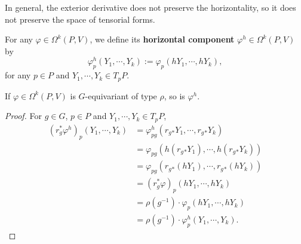 In general, the exterior derivative does not preserve the horizontality, so it does not preserve the space of tensorial forms.
\begin{definition}
    For any $\varphi\in\Omega^k(P, V)$, we define its \textbf{horizontal component} $\varphi^h\in\Omega^k(P, V)$ by
    \begin{equation*}
        \varphi^h_p(Y_1, \cdots, Y_k) := \varphi_p(hY_1, \cdots, hY_k),
    \end{equation*}
    for any $p\in P$ and $Y_1, \cdots, Y_k\in T_pP$. 
\end{definition}
\begin{proposition}\label{prop:horizontal-component-preserves-G-equivariance}
    If $\varphi\in\Omega^k(P, V)$ is $G$-equivariant of type $\rho$, so is $\varphi^h$.
\end{proposition}
\begin{proof}
    For $g\in G$, $p\in P$ and $Y_1, \cdots, Y_k\in T_pP$,
    \begin{align*}
        (r_g^*\varphi^h)_p(Y_1, \cdots, Y_k) 
        &= \varphi^h_{pg}(r_g{}_*Y_1, \cdots, r_g{}_*Y_k)\\
        &= \varphi_{pg}(h(r_g{}_*Y_1), \cdots, h(r_g{}_*Y_k))\\
        &= \varphi_{pg}(r_g{}_*(hY_1), \cdots, r_g{}_*(hY_k))\\
        &= (r_g^*\varphi)_p(hY_1, \cdots, hY_k)\\
        &= \rho(g^{-1})\cdot\varphi_p(hY_1, \cdots, hY_k)\\
        &= \rho(g^{-1})\cdot\varphi^h_p(Y_1, \cdots, Y_k).
    \end{align*}
\end{proof}

